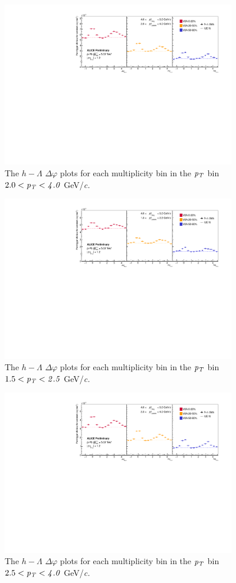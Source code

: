 \documentclass[ALICE,manyauthors]{ALICE_analysis_notes}
\begin{document}
\begin{figure}[ht]
\centering
\includegraphics[width=4in]{figures/h_lambda_dphi_all_2_4.pdf}
\caption{The $h-\Lambda$ $\Delta\varphi$ plots for each multiplicity bin in the $\it{p}_T$ bin $2.0 < \it{p}_T < 4.0$ GeV/\it{c}.}
\label{h-lambda_dphi_all_2_4}
\end{figure}



\begin{figure}[ht]
\centering
\includegraphics[width=4in]{figures/h_lambda_dphi_all_15_25.pdf}
\caption{The $h-\Lambda$ $\Delta\varphi$ plots for each multiplicity bin in the $\it{p}_T$ bin $1.5 < \it{p}_T < 2.5$ GeV/\it{c}.}
\label{h-lambda_dphi_all_15_25}
\end{figure}

\begin{figure}[ht]
\centering
\includegraphics[width=4in]{figures/h_lambda_dphi_all_25_40.pdf}
\caption{The $h-\Lambda$ $\Delta\varphi$ plots for each multiplicity bin in the $\it{p}_T$ bin $2.5 < \it{p}_T < 4.0$ GeV/\it{c}.}
\label{h-lambda_dphi_all_25_40}
\end{figure}
\end{document}
